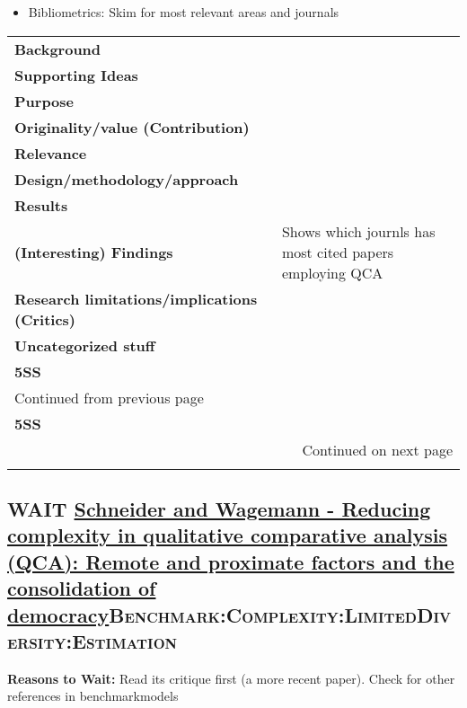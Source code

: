 \documentclass[11pt]{article}
\begin{document}
\begin{itemize}
\item Bibliometrics: Skim for most relevant areas and journals
\end{itemize}

\begin{longtable}{l|p{}}
\hline
\hline
\textbf{Background} & \\
\textbf{Supporting Ideas} & \\
\textbf{Purpose} & \\
\textbf{Originality/value (Contribution)} & \\
\textbf{Relevance} & \\
\textbf{Design/methodology/approach} & \\
\textbf{Results} & \\
\textbf{(Interesting) Findings} & Shows which journls has most cited papers employing QCA\\
\textbf{Research limitations/implications (Critics)} & \\
\textbf{Uncategorized stuff} & \\
\textbf{5SS} & \\
\hline
\endfirsthead
\multicolumn{2}{l}{Continued from previous page} \\

\textbf{5SS} &  \\

\hline
\endhead
\hline\multicolumn{2}{r}{Continued on next page} \\
\endfoot
\endlastfoot
\hline
\hline
\end{longtable}


\subsection*{{\bfseries\sffamily WAIT} \href{https://doi.org/10.1111/j.1475-6765.2006.00635.x}{Schneider and Wagemann - Reducing complexity in qualitative comparative analysis (QCA): Remote and proximate factors and the consolidation of democracy}\hfill{}\textsc{Benchmark:Complexity:LimitedDiversity:Estimation}}
\label{sec:orgc7a71a8}
\textbf{Reasons to Wait:} Read its critique first (a more recent paper). Check for other references in benchmarkmodels
\end{document}
